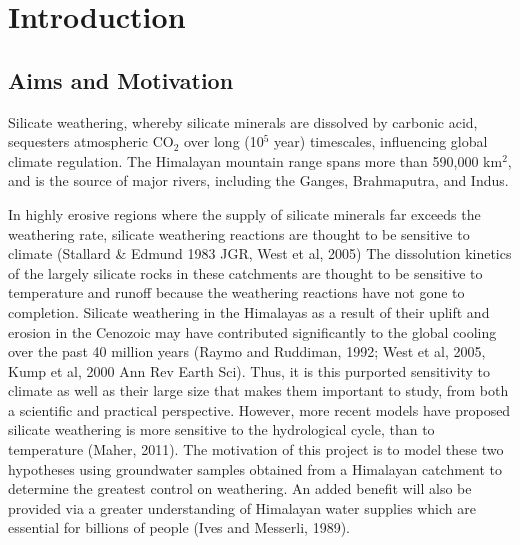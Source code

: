 
\section{Introduction}

\subsection{Aims and Motivation}


Silicate weathering, whereby silicate minerals are dissolved by carbonic acid, 
sequesters atmospheric CO$_2$ over long (10$^5$ year) timescales, influencing global climate regulation.
The Himalayan mountain range spans more than 590,000 km$^2$, and is the source of major rivers, including the Ganges, Brahmaputra, and Indus. 


\bsk

In highly erosive regions where the supply of silicate minerals far exceeds the weathering rate, silicate weathering reactions are thought to be sensitive to climate (Stallard \& Edmund 1983 JGR, West et al, 2005) The dissolution kinetics of the largely silicate rocks in these catchments are thought to be sensitive to temperature and runoff because the weathering reactions have not gone to completion. Silicate weathering in the Himalayas as a result of their uplift and erosion in the Cenozoic may have contributed significantly to the global 
cooling over the past 40 million years (Raymo and Ruddiman, 1992; West et al, 2005, Kump et al, 2000 Ann Rev Earth Sci). 
Thus, it is this purported sensitivity to climate as well as their large size that makes them important to study, from both a scientific and practical perspective. However, more recent models have proposed silicate weathering is more sensitive to the hydrological cycle, than to temperature (Maher, 2011). The motivation of this project is to model these two hypotheses using groundwater samples obtained from a Himalayan catchment to determine the greatest control on weathering. An added benefit will also be provided via a greater understanding of Himalayan water supplies which are essential for billions of people (Ives and Messerli, 1989). 



\bsk

